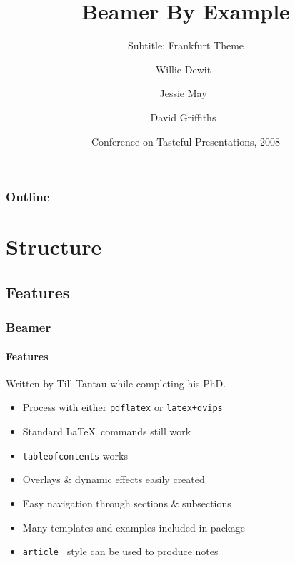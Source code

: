 \documentclass{beamer}
\title[Beamer By Example] %
{Beamer By Example}
\subtitle
{Subtitle: Frankfurt Theme}
\author[dfg] %
{Willie Dewit~\inst{1} \and Jessie May~\inst{2} \and David Griffiths~\inst{3}}
\institute[Universities of Somewhere and Elsewhere] %
{
  \inst{1}%
  Department of Mathematics\\
  University of Somewhere
  \and
  \inst{2}%
  Scottish Institute for Higher \TeX nology
  \and
  \inst{3}%
  University of Dundee}
\date[CTP 2007] %
{Conference on Tasteful Presentations, 2008}
\begin{document}
\begin{frame}
  \titlepage
\end{frame}

\begin{frame}
  \frametitle{Outline}
  \tableofcontents[pausesections]
\end{frame}




\section{Structure}
\subsection{Features}
\begin{frame}
\frametitle{Beamer}
\framesubtitle{Features}
Written by Till Tantau while completing his PhD.
\begin{itemize}
\item Process with either \texttt{pdflatex} or \texttt{latex+dvips}\pause
\item Standard \LaTeX\ commands still work\pause
\item \texttt{tableofcontents} works \pause
\item Overlays \&  dynamic effects easily created\pause
\item Easy navigation through sections \&  subsections\pause
\item Many templates and examples included in package\pause
\item \texttt{article } style can be used to produce notes
\end{itemize}
\end{frame}
\end{document}
